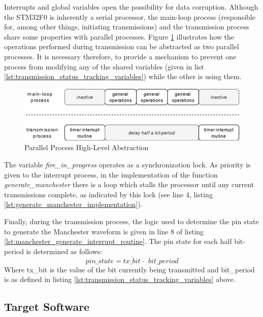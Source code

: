 Interrupts and global variables open the possibility for data corruption. Although the STM32F0 is inherently a serial processor, the main-loop process (responsible for, among other things, initiating transmissions) and the transmission process share some properties with parallel processes. Figure \ref{fig:parallel_process_abstraction} illustrates how the operations performed during transmission can be abstracted as two parallel processes. It is necessary therefore, to provide a mechanism to prevent one process from modifying any of the shared variables (given in list \ref{lst:transmission_status_tracking_variables}) while the other is using them.

\begin{figure}[H]
	\centering
	\includegraphics[width=0.8\linewidth]{figures/design/parallel_process_transmission.png}
	\caption{Parallel Process High-Level Abstraction}
	\label{fig:parallel_process_abstraction}
\end{figure}

The variable \textit{fire\_in\_progress} operates as a synchronization lock. As priority is given to the interrupt process, in the implementation of the function \textit{generate\_manchester} there is a loop which stalls the processor until any current transmissions complete, as indicated by this lock (see line 4, listing \ref{lst:generate_manchester_implementation}).

Finally, during the transmission process, the logic used to determine the pin state to generate the Manchester waveform is given in line 8 of listing \ref{lst:manchester_generate_interrupt_routine}. The pin state for each half bit-period is determined as follows: \[pin\_state = \overline{tx\_bit} \;\; \widehat{} \;\; bit\_period\] Where tx\_bit is the value of the bit currently being transmitted and bit\_period is as defined in listing \ref{lst:transmission_status_tracking_variables} above.






\subsection{Target Software}

